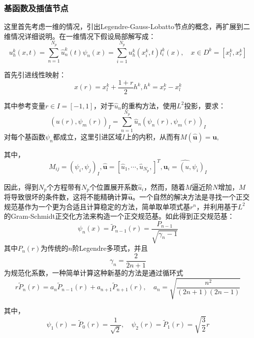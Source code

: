 \documentclass[12pt]{article}
\newcommand{\upcite}[1]{\textsuperscript{\textsuperscript{\cite{#1}}}}
\begin{document}
\subsubsection{基函数及插值节点}
这里首先考虑一维的情况，引出Legendre-Gauss-Lobatto节点的概念，再扩展到二维情况详细说明。在一维情况下假设局部解写成：
\begin{equation}\label{2-23}
u_h^k(x,t)=\sum_{n=1}^{N_p}\hat{u}_n^k(t)\psi_n(x)=\sum_{i=1}^{N_p}u_h^k(x_i^k,t)l_i^k(x),\quad x \in D^k=[x_l^k,x_r^k]
\end{equation}
\par
首先引进线性映射：
\begin{equation}\label{2-24}
x(r)=x_l^k+\frac{1+r}{2}h^k,h^k=x_r^k-x_l^k
\end{equation}
\par
其中参考变量$r \in I=[-1,1]$，对于$\hat{u}_n$的重构方法，使用$L^2$投影，要求：
\begin{equation}\label{2-25}
(u(r),\psi_m(r))_I=\sum_{n=1}^{N_p}\hat{u}_n(\psi_n(r),\psi_m(r))_I
\end{equation}
对每个基函数$\psi_n$都成立，这里引进区域$I$上的内积，从而有$M(\hat{\boldsymbol{u}})=\boldsymbol{u}$,
\par
其中，
\begin{equation*}
M_{ij}=(\psi_i,\psi_j)_I,\hat{\boldsymbol{u}}=[\hat{u}_1,\cdots,\hat{u}_{N_p},]^T,\hat{\boldsymbol{u}_i=(u,\psi_i)_I}
\end{equation*}
\par
因此，得到$N_p$个方程带有$N_p$个位置展开系数$\hat{u}_i$，然而，随着$M$逼近阶$N$增加，$M$将导致很坏的条件数，这将不能精确计算$\hat{\boldsymbol{u}}$。一个自然的解决方法是寻找一个正交规范基作为一个更为合适且计算稳定的方法，简单取单项式基$r^n$，并利用基于$L^2$的Gram-Schmidt正交化方法来构造一个正交规范基。如此得到正交规范基\upcite{Szeg1939}：
\begin{equation}\label{2-26}
\psi_n(x)=\tilde{P}_{n-1}(r)=\frac{P_{n-1}}{\sqrt{\gamma_n-1}}
\end{equation}
其中$P_n(r)$为传统的$n$阶Legendre多项式，并且
\begin{equation}\label{2-27}
\gamma_n=\frac{2}{2n+1}
\end{equation}
为规范化系数，一种简单计算这种新基的方法是通过循环式
\begin{equation}\label{2-28}
r\tilde{P}_n(r)=a_n\tilde{P}_{n-1}(r)+a_{n+1}\tilde{P}_{n+1}(r),\quad
a_n=\sqrt{\frac{n^2}{(2n+1)(2n-1)}}
\end{equation}
\par
其中，
\begin{equation*}
\psi_1(r)=\tilde{P}_0(r)=\frac{1}{\sqrt{2}},\quad \psi_2(r)=\tilde{P}_1(r)=\sqrt{\frac{3}{2}}r
\end{equation*}
\end{document}
